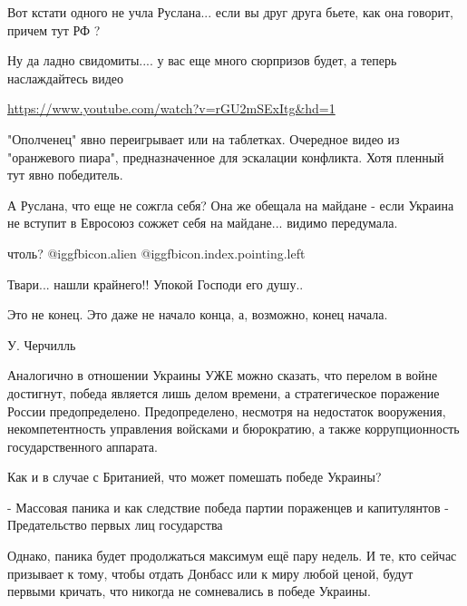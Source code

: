 \begin{itemize}
\begin{multicols}{2}
Вот кстати одного не учла Руслана... если вы друг друга бьете, как она
говорит, причем тут РФ  ? 

Ну да ладно свидомиты.... у вас еще много сюрпризов будет, а теперь наслаждайтесь
видео

\url{https://www.youtube.com/watch?v=rGU2mSExItg&hd=1}


"Ополченец" явно переигрывает или на таблетках. Очередное видео из "оранжевого
пиара", предназначенное для эскалации конфликта. Хотя пленный тут явно
победитель.


А Руслана, что еще не сожгла себя? Она же обещала на майдане - если Украина не
вступит в Евросоюз сожжет себя на майдане... видимо передумала.

чтоль?  @igg{fbicon.alien}   @igg{fbicon.index.pointing.left}   


Твари... нашли крайнего!! Упокой Господи его душу..




Это не конец. Это даже не начало конца, а, возможно, конец начала.

У. Черчилль

Аналогично в отношении Украины УЖЕ можно сказать, что перелом в войне
достигнут, победа является лишь делом времени, а стратегическое поражение
России предопределено. Предопределено, несмотря на недостаток вооружения,
некомпетентность управления войсками и бюрократию, а также коррупционность
государственного аппарата.

Как и в случае с Британией, что может помешать победе Украины?

- Массовая паника и как следствие победа партии пораженцев и капитулянтов
- Предательство первых лиц государства

Однако, паника будет продолжаться максимум ещё пару недель. И те, кто сейчас
призывает к тому, чтобы отдать Донбасс или к миру любой ценой, будут первыми
кричать, что никогда не сомневались в победе Украины.

\end{multicols}



\end{itemize}
